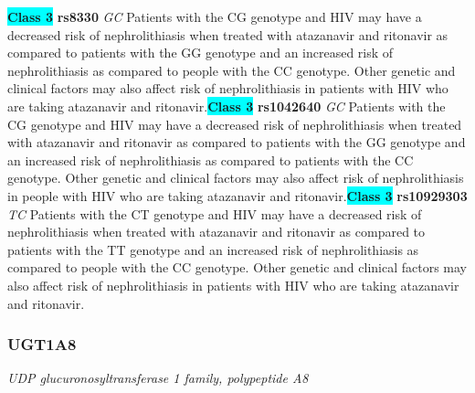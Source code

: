 \documentclass{report}
\begin{document}
\textbf{\colorbox{cyan} {Class 3}} \textbf{ rs8330 } \textit{ GC }
Patients with the CG genotype and HIV may have a decreased risk of nephrolithiasis when treated with atazanavir and ritonavir as compared to patients with the GG genotype and an increased risk of nephrolithiasis as compared to people with the CC genotype. Other genetic and clinical factors may also affect risk of nephrolithiasis in patients with HIV who are taking atazanavir and ritonavir.\newline\textbf{\colorbox{cyan} {Class 3}} \textbf{ rs1042640 } \textit{ GC }
Patients with the CG genotype and HIV may have a decreased risk of nephrolithiasis when treated with atazanavir and ritonavir as compared to patients with the GG genotype and an increased risk of nephrolithiasis as compared to patients with the CC genotype. Other genetic and clinical factors may also affect risk of nephrolithiasis in people with HIV who are taking atazanavir and ritonavir.\newline\textbf{\colorbox{cyan} {Class 3}} \textbf{ rs10929303 } \textit{ TC }
Patients with the CT genotype and HIV may have a decreased risk of nephrolithiasis when treated with atazanavir and ritonavir as compared to patients with the TT genotype and an increased risk of nephrolithiasis as compared to people with the CC genotype. Other genetic and clinical factors may also affect risk of nephrolithiasis in patients with HIV who are taking atazanavir and ritonavir. \newline\subsubsection{ UGT1A8 }
\textit{ UDP glucuronosyltransferase 1 family, polypeptide A8 }
\end{document}
